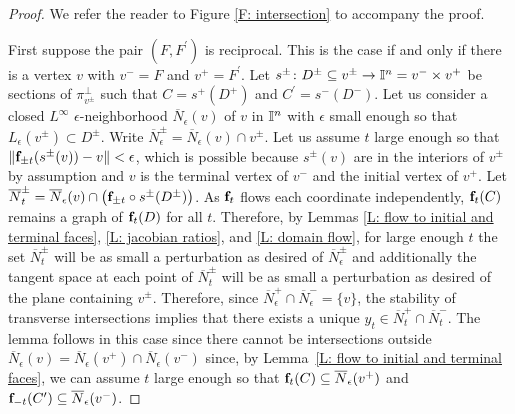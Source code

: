 \begin{proof}
	We refer the reader to Figure \ref{F: intersection} to accompany the proof.

	First suppose the pair $(F,F^\prime)$ is reciprocal.
	This is the case if and only if there is a vertex $v$ with $v^- = F$ and $v^+ = F^\prime$.
	Let $s^\pm \colon D^\pm \subseteq v^\pm \to \mathbb{I}^n = v^- \times v^+$ be sections of $\pi_{v^\pm}^\perp$ such that $C = s^+(D^+)$ and $C^\prime = s^-(D^-)$.
	Let us consider a closed $L^\infty$ $\epsilon$-neighborhood $\overline N_\epsilon(v)$ of $v$ in $\mathbb{I}^n$ with $\epsilon$ small enough so that $L_\epsilon(v^\pm) \subset D^\pm$.
	Write $\overline N_\epsilon^\pm = \overline N_\epsilon(v) \cap v^\pm$.
	Let us assume $t$ large enough so that $\Vert{\mathbf{f}_{\pm t}(s^\pm(v)) - v}\Vert < \epsilon$, which is possible because $s^\pm(v)$ are in the interiors of $v^\pm$ by assumption and $v$ is the terminal vertex of $v^-$ and the initial vertex of $v^+$.
	Let $\overline N_t^\pm = \overline N_\epsilon(v) \cap \big(\mathbf{f}_{\pm t}\circ s^\pm (D^\pm)\big)$. As $\mathbf{f}_t$ flows each coordinate independently, $\mathbf{f}_t(C)$ remains a graph of $\mathbf{f}_t(D)$ for all $t$. Therefore, by Lemmas \ref{L: flow to initial and terminal faces}, \ref{L: jacobian ratios}, and \ref{L: domain flow}, for large enough $t$ the set $\overline N_t^\pm$ will be as small a perturbation as desired of $\overline N_\epsilon^\pm$ and additionally the tangent space at each point of $\overline N_t^\pm$ will be as small a perturbation as desired of the plane containing $v^\pm$.
	Therefore, since $\overline N_\epsilon^+ \cap \overline N_\epsilon^- = \{v\}$, the stability of transverse intersections implies that there exists a unique $y_t \in \overline N_t^+ \cap \overline N_t^-$. The lemma follows in this case since there cannot be intersections outside $\overline N_\epsilon(v) = \overline N_\epsilon(v^+) \cap \overline N_\epsilon(v^-)$ since, by Lemma~\ref{L: flow to initial and terminal faces}, we can assume $t$ large enough so that $\mathbf{f}_t(C) \subseteq \overline N_\epsilon(v^+)$ and $\mathbf{f}_{-t}(C^\prime) \subseteq \overline N_\epsilon(v^-)$.


\end{proof}
